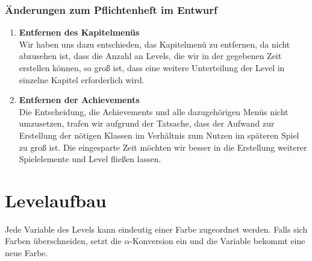 \subsection{Änderungen zum Pflichtenheft im Entwurf}
\begin{enumerate}
	\item {\textbf{Entfernen des Kapitelmenüs}}\\
		Wir haben uns dazu entschieden, das Kapitelmenü zu entfernen, da nicht abzusehen ist, dass die Anzahl an Levels, die wir in der gegebenen Zeit erstellen können, so groß ist, dass eine weitere Unterteilung der Level in einzelne Kapitel erforderlich wird.
	\item {\textbf{Entfernen der Achievements}}\\
		Die Entscheidung, die Achievements und alle dazugehörigen Menüs nicht umzusetzen, trafen wir aufgrund der Tatsache, dass der Aufwand zur Erstellung der nötigen Klassen im Verhältnis zum Nutzen im späteren Spiel zu groß ist. Die eingesparte Zeit möchten wir besser in die Erstellung weiterer Spielelemente und Level fließen lassen. 
\end{enumerate}
\clearpage

\chapter{Levelaufbau}

Jede Variable des Levels kann eindeutig einer Farbe zugeordnet werden. Falls sich Farben überschneiden, setzt die $\alpha$-Konversion ein und die Variable bekommt eine neue Farbe.\\
